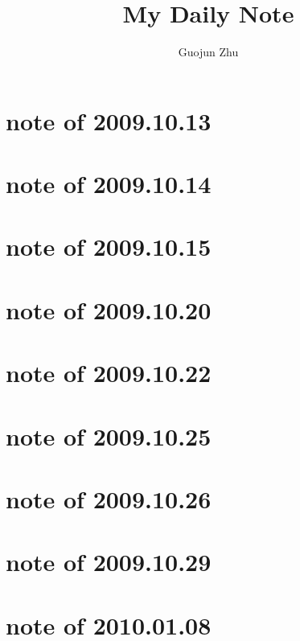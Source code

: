 \documentclass{article}
\author{Guojun Zhu}
\title{My Daily Note}
\begin{document}

{}



















\section{note of 2009.10.13}

\section{note of 2009.10.14}

\section{note of 2009.10.15}

\section{note of 2009.10.20}

\section{note of 2009.10.22}

\section{note of 2009.10.25}

\section{note of 2009.10.26}

\section{note of 2009.10.29}


\section{note of 2010.01.08}

\end{document}
